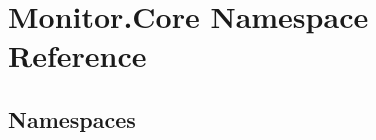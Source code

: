 \hypertarget{namespace_monitor_1_1_core}{}\section{Monitor.\+Core Namespace Reference}
\label{namespace_monitor_1_1_core}
\subsection*{Namespaces}
\begin{DoxyCompactItemize}
\end{DoxyCompactItemize}
